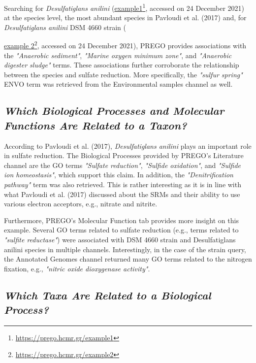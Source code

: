    Searching for \textit{Desulfatiglans anilini} (\href{https://prego.hcmr.gr/example1}{example1}\footnote{\href{https://prego.hcmr.gr/example1}{https://prego.hcmr.gr/example1}}, accessed on 24 December 2021) at the species level, 
   the most abundant species in Pavloudi et al. (2017) and, 
   for \textit{Desulfatiglans anilini} DSM 4660 strain ({\href{https://prego.hcmr.gr/example2}{example 2}\footnote{\href{https://prego.hcmr.gr/example2}{https://prego.hcmr.gr/example2}}, accessed on 24 December 2021), 
   PREGO provides associations with the \textit{"Anaerobic sediment"}, \textit{"Marine oxygen minimum zone"}, and \textit{"Anaerobic digester sludge"} terms. 
   These associations further corroborate the relationship between the species and sulfate reduction. 
   More specifically, the \textit{"sulfur spring"} ENVO term was retrieved from the Environmental samples channel as well.


   \subsection*{\textit{Which Biological Processes and Molecular Functions Are Related to a Taxon?}}
   \label{subsec:proc-taxa}

   According to Pavloudi et al. (2017), \textit{Desulfatiglans anilini} plays an important role in sulfate reduction. 
   The Biological Processes provided by PREGO's Literature channel are the GO terms \textit{"Sulfate reduction"}, \textit{"Sulfide oxidation"}, and \textit{"Sulfide ion homeostasis"}, which support this claim. 
   In addition, the \textit{"Denitrification pathway"} term was also retrieved. 
   This is rather interesting as it is in line with what Pavloudi et al. (2017) discussed about the SRMs and their ability to use various electron acceptors, e.g., nitrate and nitrite.

   Furthermore, PREGO's Molecular Function tab provides more insight on this example. Several GO terms related to sulfate reduction (e.g., terms related to \textit{"sulfite reductase"}) were associated with DSM 4660 strain and Desulfatiglans anilini species in multiple channels. Interestingly, in the case of the strain query, the Annotated Genomes channel returned many GO terms related to the nitrogen fixation, e.g., \textit{"nitric oxide dioxygenase activity"}.


   \subsection*{\textit{Which Taxa Are Related to a Biological Process?}}
   \label{subsec:taxa-proces}

}
